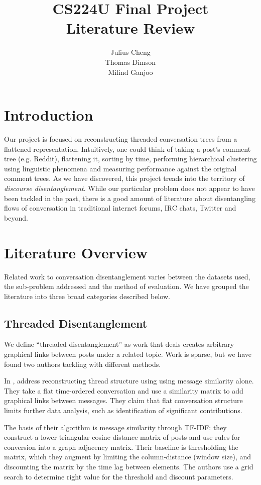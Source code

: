 \documentclass{article}
\title{CS224U Final Project \\Literature Review}
\author{Julius Cheng\\ Thomas Dimson \\ Milind Ganjoo}
\begin{document}
\maketitle

\section{Introduction}
Our project is focused on reconstructing threaded conversation trees
from a flattened representation. Intuitively, one could think of 
taking a post's comment tree (e.g. Reddit), flattening it, sorting by time, performing
hierarchical clustering using linguistic phenomena and measuring performance 
against the original comment trees. As we have
discovered, this project treads into the territory of \textit{discourse disentanglement}.
While our particular problem does not appear to have been tackled in the past,
there is a good amount of literature about disentangling flows of conversation
in traditional internet forums, IRC chats, Twitter and beyond.

\section{Literature Overview}
Related work to conversation disentanglement varies between the datasets used, the 
sub-problem addressed and the method of evaluation. We have grouped the literature into
three broad categories described below.

\subsection{Threaded Disentanglement}
We define ``threaded disentanglement'' as work that deals creates arbitrary
graphical links between posts under a related topic. Work is sparse, but we have found
two authors tackling with different methods.

In \cite{Wang2008a}, address reconstructing thread structure using using 
message similarity alone. They take a flat
time-ordered conversation and use a similarity matrix to add graphical
links between messages. They claim that flat conversation structure
limits further data analysis, such as identification of significant
contributions. 

The basis of their algorithm is message similarity through TF-IDF: they
construct a lower triangular cosine-distance matrix of posts and use rules 
for conversion into a graph adjacency matrix. Their baseline is thresholding the
matrix, which they augment by limiting the column-distance (window size), and discounting
the matrix by the time lag between elements. The authors use a grid search to
determine right value for the threshold and discount parameters.
\end{document}
